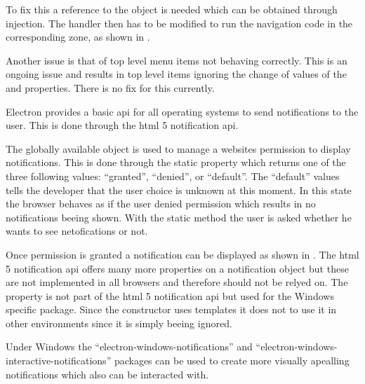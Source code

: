 To fix this a reference to the  object is needed which can be obtained through injection. The  handler then has to be modified to run the navigation code in the corresponding zone, as shown in .


Another issue is that of top level menu items not behaving correctly. This is an ongoing issue and results in top level items ignoring the change of values of the  and  properties. There is no fix for this currently. \cite{topMenuItems}


Electron provides a basic \gls{api} for all operating systems to send notifications to the user. This is done through the \gls{html} 5 notification \gls{api}.


The globally available  object is used to manage a websites permission to display notifications. This is done through the static  property which returns one of the three following values: \enquote{granted}, \enquote{denied}, or \enquote{default}. The \enquote{default} values tells the developer that the user choice is unknown at this moment. In this state the browser behaves as if the user denied permission which results in no notifications beeing shown. With the static  method the user is asked whether he wants to see netofications or not.


Once permission is granted a notification can be displayed as shown in . The \gls{html} 5 notification \gls{api} offers many more properties on a notification object but these are not implemented in all browsers and therefore should not be relyed on. The  property is not part of the \gls{html} 5 notification \gls{api} but used for the Windows specific package. Since the constructor uses templates it does not  to use it in other environments since it is simply beeing ignored. \cite{mdnNotification}


Under Windows the \enquote{electron-windows-notifications} \cite{winNot} and \enquote{electron-windows-interactive-notifications} \cite{winIntNot} packages can be used to create more visually apealling notifications which also can be interacted with.

